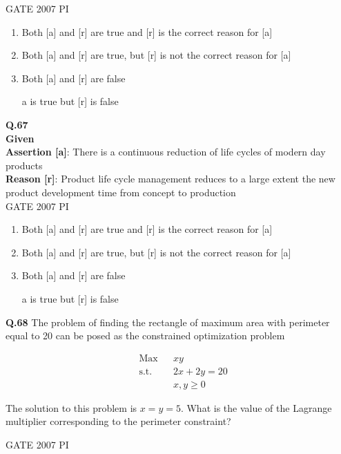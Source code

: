 \documentclass[journal,12pt,onecolumn]{exam}
\theoremstyle{remark}
\begin{document}
\hfill{GATE 2007 PI}
\begin{enumerate}
    \item Both [a] and [r] are true and [r] is the correct reason for [a]
    \item Both [a] and [r] are true, but [r] is not the correct reason for [a]
    \item Both [a] and [r] are false
    \item [a] is true but [r] is false
\end{enumerate}
\noindent
\textbf{Q.67} \\
\textbf{Given} \\
\textbf{Assertion [a]}: There is a continuous reduction of life cycles of modern day products \\
\textbf{Reason [r]}: Product life cycle management reduces to a large extent the new product development time from concept to production \\[4pt]

\hfill{GATE 2007 PI}

\begin{enumerate}
    \item Both [a] and [r] are true and [r] is the correct reason for [a]
    \item Both [a] and [r] are true, but [r] is not the correct reason for [a]
    \item Both [a] and [r] are false
    \item [a] is true but [r] is false
\end{enumerate}
\noindent
\textbf{Q.68}
The problem of finding the rectangle of maximum area with perimeter equal to 20 
can be posed as the constrained optimization problem

\[
\begin{aligned}
&\text{Max} && xy \\
&\text{s.t.} && 2x + 2y = 20 \\
& && x, y \geq 0
\end{aligned}
\]

The solution to this problem is \( x = y = 5 \). 
What is the value of the Lagrange multiplier corresponding to the perimeter constraint?

\hfill{GATE 2007 PI}
\end{document}
